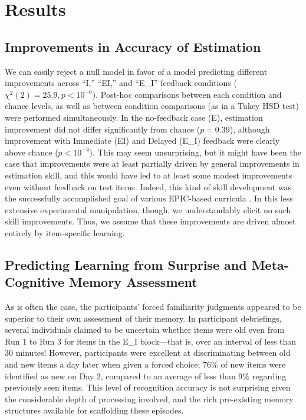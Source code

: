 \section{Results}

\subsection{Improvements in Accuracy of Estimation}

We can easily reject a null model in favor of a model predicting different
improvements across ``I,'' ``EI,'' and ``E\_I'' feedback conditions ($\chi^2(2)
= 25.9, p < 10^{-6}$). Post-hoc comparisons between each condition and chance
levels, as well as between condition comparisons (as in a Tukey HSD test) were
performed simultaneously. 
In the no-feedback case (E), estimation improvement
did not differ significantly from chance ($p = 0.39$), although improvement with
Immediate (EI) and Delayed (E\_I) feedback were clearly above chance ($p <
10^{-4}$). This may seem unsurprising, but it might have been the case that
improvements were at least partially driven by general improvements in
estimation skill, and this would have led to at least some modest improvements
even without feedback on test items. Indeed, this kind of skill development was
the successfully accomplished goal of various EPIC-based curricula
\parencite[e.g.,][]{munnich_numerically-driven_2004,ranney_designing_2008}. In this
less extensive experimental manipulation, though, we understandably elicit no
such skill improvements. Thus, we assume that these improvements are driven
almost entirely by item-specific learning.

\subsection{Predicting Learning from Surprise and Meta-Cognitive Memory
Assessment}

As is often the case, the participants' forced familiarity judgments appeared to
be superior to their own assessment of their memory.  In participant
debriefings, several individuals claimed to be uncertain whether items were old
even from Run 1 to Run 3 for items in the E\_I block––that is, over an interval
of less than 30 minutes!  However, participants were excellent at discriminating
between old and new items a day later when given a forced choice; 76\% of new
items were identified as new on Day 2, compared to an average of less than 9\%
regarding previously seen items. This level of recognition accuracy is not
surprising given the considerable depth of processing involved, and the rich
pre-existing memory structures available for scaffolding these episodes.

